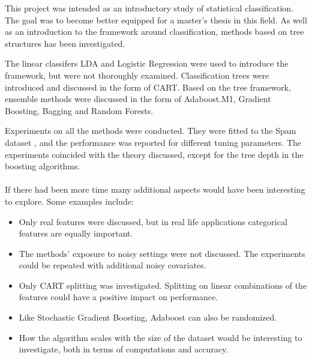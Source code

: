 
This project was intended as an introductory study of statistical classification. The goal was to become better equipped for a master's thesis in this field. 
As well as an introduction to the framework around classification, methods based on tree structures has been investigated. 

The linear classifers LDA and Logistic Regression were used to introduce the framework, but were not thoroughly examined. 
Classification trees were introduced and discussed in the form of CART. Based on the tree framework, ensemble methods were discussed in the form of Adaboost.M1, Gradient Boosting, Bagging and Random Forests.

Experiments on all the methods were conducted. They were fitted to the Spam dataset \cite{Spamdata}, and the performance was reported for different tuning parameters. The experiments coincided with the theory discussed, except for the tree depth in the boosting algorithms. 
\\
\\
If there had been more time many additional aspects would have been interesting to explore. Some examples include:
\begin{itemize}
  \item Only real features were discussed, but in real life applications categorical features are equally important. 
  \item The methods' exposure to noisy settings were not discussed. The experiments could be repeated with additional noisy covariates. 
  \item Only CART splitting was investigated. Splitting on linear combinations of the features could have a positive impact on performance. 
  \item Like Stochastic Gradient Boosting, Adaboost can also be randomized. 
  \item How the algorithm scales with the size of the dataset would be interesting to investigate, both in terms of computations and accuracy.
\end{itemize}
